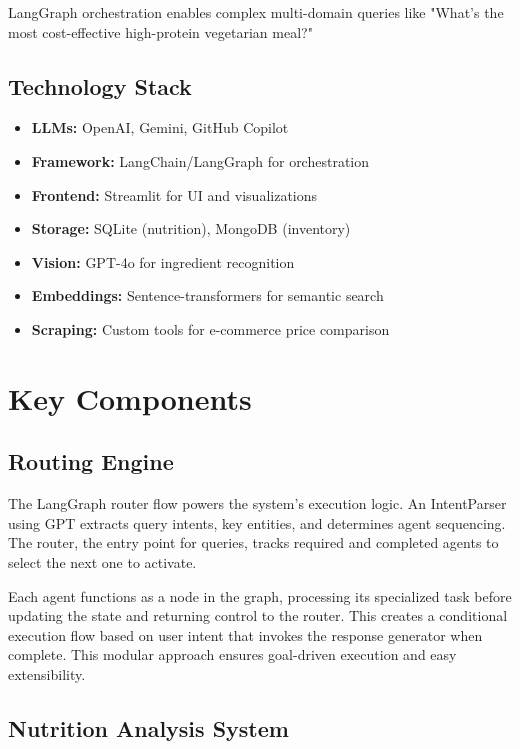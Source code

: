 \documentclass{ecai}
\begin{document}
LangGraph orchestration enables complex multi-domain queries like "What's the most cost-effective high-protein vegetarian meal?"

\subsection{Technology Stack}

\begin{itemize}[noitemsep,topsep=0pt]
    \item \textbf{LLMs:} OpenAI, Gemini, GitHub Copilot
    \item \textbf{Framework:} LangChain/LangGraph for orchestration
    \item \textbf{Frontend:} Streamlit for UI and visualizations
    \item \textbf{Storage:} SQLite (nutrition), MongoDB (inventory)
    \item \textbf{Vision:} GPT-4o for ingredient recognition
    \item \textbf{Embeddings:} Sentence-transformers for semantic search
    \item \textbf{Scraping:} Custom tools for e-commerce price comparison
\end{itemize}

\section{Key Components}

\subsection{Routing Engine}

The LangGraph router flow powers the system's execution logic. An IntentParser using GPT extracts query intents, key entities, and determines agent sequencing. The router, the entry point for queries, tracks required and completed agents to select the next one to activate.

Each agent functions as a node in the graph, processing its specialized task before updating the state and returning control to the router. This creates a conditional execution flow based on user intent that invokes the response generator when complete. This modular approach ensures goal-driven execution and easy extensibility.

\subsection{Nutrition Analysis System}
\end{document}
